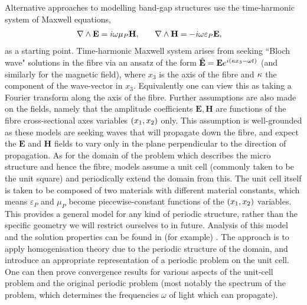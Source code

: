 Alternative approaches to modelling band-gap structures use the time-harmonic system of Maxwell equations,
\begin{align*}
	\nabla\wedge\mathbf{E} &= i\omega\mu_{P}\mathbf{H}, &\quad \nabla\wedge\mathbf{H} &= -i\omega\varepsilon_{P}\mathbf{E},
\end{align*} 
as a starting point.
Time-harmonic Maxwell system arises from seeking ``Bloch wave" solutions in the fibre via an ansatz of the form $\hat{\mathbf{E}}=\mathbf{E}e^{i\left( \kappa x_3-\omega t \right)}$ (and similarly for the magnetic field), where $x_3$ is the axis of the fibre and $\kappa$ the component of the wave-vector in $x_3$.
Equivalently one can view this as taking a Fourier transform along the axis of the fibre.
Further assumptions are also made on the fields, namely that the amplitude coefficients $\mathbf{E},\mathbf{H}$ are functions of the fibre cross-sectional axes variables $\left( x_1,x_2 \right)$ only.
This assumption is well-grounded as these models are seeking waves that will propagate down the fibre, and expect the $\mathbf{E}$ and $\mathbf{H}$ fields to vary only in the plane perpendicular to the direction of propagation.
As for the domain of the problem which describes the micro structure and hence the fibre, models assume a unit cell (commonly taken to be the unit square) and periodically extend the domain from this.
The unit cell itself is taken to be composed of two materials with different material constants, which means $\varepsilon_{P}$ and $\mu_{P}$ become piecewise-constant functions of the $\left( x_1,x_2 \right)$ variables.
This provides a general model for any kind of periodic structure, rather than the specific geometry we will restrict ourselves to in future.
Analysis of this model and the solution properties can be found in (for example) \cite{cooper2014bandgaps}. 
The approach is to apply homogenisation theory due to the periodic structure of the domain, and introduce an appropriate representation of a periodic problem on the unit cell.
One can then prove convergence results for various aspects of the unit-cell problem and the original periodic problem (most notably the spectrum of the problem, which determines the frequencies $\omega$ of light which can propagate). \newline
{}

